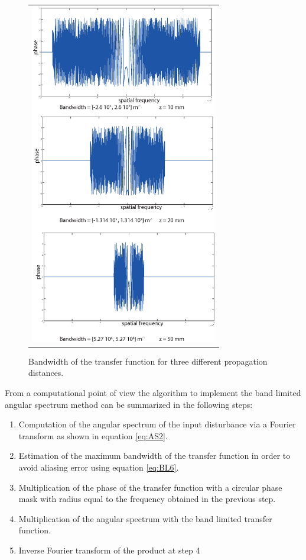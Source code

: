 \begin{figure}[H]
 	\begin{center}
 		\begin{tabular}{c}
 				\includegraphics[height=15cm]{phaseHBLnew.eps}
 		\end{tabular}
 	\end{center}
 	\caption { \label{fig:bandlimitedH} 
 		Bandwidth of the transfer function for three different propagation distances. }
 \end{figure} 
 From a computational point of view the algorithm to implement the band limited angular spectrum method can be summarized in the following steps:
 \begin{enumerate}
		\item Computation of the angular spectrum of the input disturbance via a Fourier transform as shown in equation \ref{eq:AS2}.
		\item Estimation of the maximum bandwidth of the transfer function in order to avoid aliasing error using equation \ref{eq:BL6}.
		\item Multiplication of the phase of the transfer function with a circular phase mask with radius equal to the frequency obtained in the previous step.
		\item Multiplication of the angular spectrum with the band limited transfer function.
		\item Inverse Fourier transform of the product at step 4 
 \end{enumerate}
